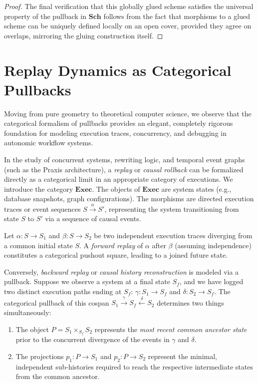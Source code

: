 \begin{proof}
The final verification that this globally glued scheme satisfies the universal property of the pullback in $\mathbf{Sch}$ follows from the fact that morphisms to a glued scheme can be uniquely defined locally on an open cover, provided they agree on overlaps, mirroring the gluing construction itself.
\end{proof}


\section{Replay Dynamics as Categorical Pullbacks}

Moving from pure geometry to theoretical computer science, we observe that the categorical formalism of pullbacks provides an elegant, completely rigorous foundation for modeling execution traces, concurrency, and debugging in autonomic workflow systems. 

In the study of concurrent systems, rewriting logic, and temporal event graphs (such as the Praxis architecture), a \emph{replay} or \emph{causal rollback} can be formalized directly as a categorical limit in an appropriate category of executions. We introduce the category $\mathbf{Exec}$. The objects of $\mathbf{Exec}$ are system states (e.g., database snapshots, graph configurations). The morphisms are directed execution traces or event sequences $S \xrightarrow{\alpha} S'$, representing the system transitioning from state $S$ to $S'$ via a sequence of causal events.

\begin{definition}
Let $\alpha: S \to S_1$ and $\beta: S \to S_2$ be two independent execution traces diverging from a common initial state $S$. A \emph{forward replay} of $\alpha$ after $\beta$ (assuming independence) constitutes a categorical pushout square, leading to a joined future state.

Conversely, \emph{backward replay} or \emph{causal history reconstruction} is modeled via a pullback. Suppose we observe a system at a final state $S_f$, and we have logged two distinct execution paths ending at $S_f$: $\gamma: S_1 \to S_f$ and $\delta: S_2 \to S_f$. 
The categorical pullback of this cospan $S_1 \xrightarrow{\gamma} S_f \xleftarrow{\delta} S_2$ determines two things simultaneously:
\begin{enumerate}
    \item The object $P = S_1 \times_{S_f} S_2$ represents the \emph{most recent common ancestor state} prior to the concurrent divergence of the events in $\gamma$ and $\delta$.
    \item The projections $p_1: P \to S_1$ and $p_2: P \to S_2$ represent the minimal, independent sub-histories required to reach the respective intermediate states from the common ancestor.
\end{enumerate}
\end{definition}


